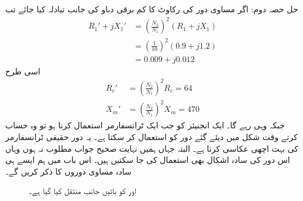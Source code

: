	حل حصہ دوم:
اگر مساوی دور کی رکاوٹ کا کم برقی دباو کی جانب تبادلہ کیا جائے تب
\begin{align*}
R_1'+j X_1' &=\left(\frac{N_2}{N_1} \right)^2 \left(R_1+j X_1 \right)\\
&=\left(\frac{1}{10} \right)^2 \left(0.9+j1.2 \right)\\
&=0.009+j0.012
\end{align*}
اسی طرح
\begin{align*}
R_c'&=\left(\frac{N_2}{N_1} \right)^2 R_c=64\\
X_m'&=\left(\frac{N_2}{N_1} \right)^2 X_m=470
\end{align*}
جبکہ  وہی رہے گا۔
%
ایک انجنیئر کو جب ایک ٹرانسفارمر استعمال کرنا ہو تو وہ حساب کرتے وقت شکل   میں دیئے گئے دور کو استعمال کر سکتا ہے۔ یہ دور حقیقی ٹرانسفارمر کی بہت اچھی عکاسی کرتا ہے۔ البتہ جہاں ہمیں نہایت صحیح جواب مطلوب نہ ہوں وہاں اس دور کی سادہ اشکال بھی استعمال کی جا سکتیں ہیں۔ اس باب میں ہم ایسے ہی سادہ مساوی دوروں کا ذکر کریں گے۔
\begin{figure}
\centering
\caption{ اور  کو بائیں جانب منتقل کیا گیا ہے۔}
\label{شکل_ٹرانسفارمر_بائیں_جانب}
\end{figure}
